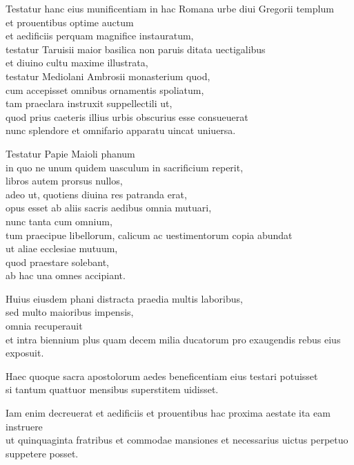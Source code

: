 \documentclass[a5paper,twoside]{article}
\begin{document}
Testatur hanc eius munificentiam in hac Romana urbe diui Gregorii templum \\
et prouentibus optime auctum \\
et aedificiis perquam magnifice instauratum, \\
testatur Taruisii maior basilica non paruis ditata uectigalibus \\
et diuino cultu maxime illustrata, \\
testatur Mediolani Ambrosii monasterium quod, \\
cum accepisset omnibus ornamentis spoliatum, \\
tam praeclara instruxit suppellectili ut, \\
quod prius caeteris illius urbis obscurius esse consueuerat \\
nunc splendore et omnifario apparatu uincat uniuersa. 

Testatur Papie Maioli phanum \\
in quo ne unum quidem uasculum in sacrificium reperit, \\
libros autem prorsus nullos, \\
adeo ut, quotiens diuina res patranda erat, \\
opus esset ab aliis sacris aedibus omnia mutuari, \\
nunc tanta cum omnium, \\
tum praecipue libellorum, calicum ac uestimentorum copia abundat \\
ut aliae ecclesiae mutuum, \\
quod praestare solebant, \\
ab hac una omnes accipiant.  

Huius eiusdem phani distracta praedia multis laboribus, \\
sed multo maioribus impensis, \\
omnia recuperauit \\
et intra biennium plus quam decem milia ducatorum pro exaugendis rebus eius exposuit.  

Haec quoque sacra apostolorum aedes beneficentiam eius testari potuisset \\
si tantum quattuor mensibus superstitem uidisset.  

Iam enim decreuerat et aedificiis et prouentibus hac proxima aestate ita eam instruere \\
ut quinquaginta fratribus et commodae mansiones et necessarius uictus perpetuo suppetere posset.  
\end{document}
